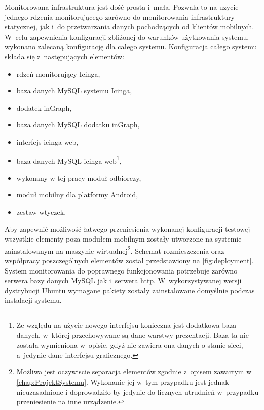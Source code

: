Monitorowana infrastruktura jest dość prosta i~mała. Pozwala to na
uzycie jednego rdzenia monitorującego zarówno do monitorowania
infrastruktury statycznej, jak i~do przetwarzania danych pochodzących
od klientów mobilnych. W~celu zapewnienia konfiguracji zbliżonej do
warunków użytkowania systemu, wykonano zalecaną konfigurację dla
całego systemu. Konfiguracja całego systemu składa się z~następujących
elementów:

\begin{itemize}
\item rdzeń monitorujący Icinga,
\item baza danych MySQL systemu Icinga,
\item dodatek inGraph,
\item baza danych MySQL dodatku inGraph,
\item interfejs icinga-web,
\item baza danych MySQL icinga-web\footnote{Ze względu na użycie
    nowego interfejsu konieczna jest dodatkowa baza danych, w~której
    przechowywane są dane warstwy prezentacji. Baza ta nie została
    wymieniona w~opisie, gdyż nie zawiera ona danych o stanie sieci,
    a~jedynie dane interfejsu graficznego.},
\item wykonany w tej pracy moduł odbiorczy,
\item moduł mobilny dla platformy Android,
\item zestaw wtyczek.
\end{itemize}

Aby zapewnić możliwość łatwego przeniesienia wykonanej konfiguracji
testowej wszystkie elementy poza modułem mobilnym zostały utworzone na
systemie zainstalowanym na maszynie wirtualnej\footnote{Możliwa jest
  oczywiscie separacja elementów zgodnie z~opisem zawartym w~
  \ref{chap:ProjektSystemu}. Wykonanie jej w~tym przypadku jest jednak
  nieuzasadnione i doprowadziło by jedynie do licznych utrudnień
  w~przypadku przeniesienie na inne urządzenie.}. Schemat
rozmieszczenia oraz współpracy poszczególnych elementów został
przedstawiony na \ref{fig:deployment}. System monitorowania do
poprawnego funkcjonowania potrzebuje zarówno serwera bazy danych MySQL
jak i~serwera http. W~wykorzystywanej wersji dystrybucji Ubuntu
wymagane pakiety zostały zainstalowane domyślnie podczas instalacji
systemu.

